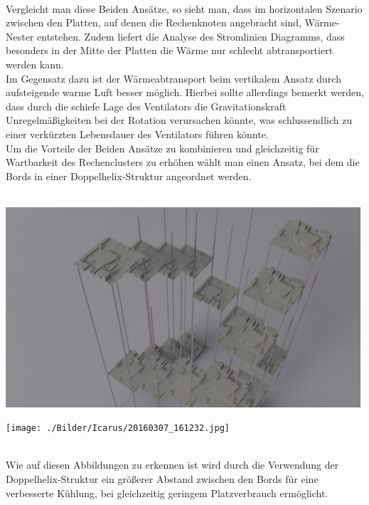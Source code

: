 ~\\
Vergleicht man diese Beiden Ansätze, so sieht man, dass im horizontalen Szenario zwischen den 
Platten, auf denen die Rechenknoten angebracht sind, Wärme-Nester entstehen. Zudem liefert die
Analyse des Stromlinien Diagramms, dass besonders in der Mitte der Platten die Wärme nur schlecht  
abtransportiert werden kann.\\
Im Gegensatz dazu ist der Wärmeabtransport beim vertikalem Ansatz durch aufsteigende warme Luft
besser möglich. Hierbei sollte allerdings bemerkt werden, dass durch die schiefe Lage des Ventilators
die Gravitationskraft Unregelmäßigkeiten bei der Rotation verursachen könnte, was schlussendlich zu einer verkürzten Lebensdauer des Ventilators führen könnte.\\
Um die Vorteile der Beiden Ansätze zu kombinieren und gleichzeitig für Wartbarkeit des 
Rechenclusters zu erhöhen wählt man einen Ansatz, bei dem die Bords in einer Doppelhelix-Struktur 
angeordnet werden.\\
~\\
\begin{minipage}{0.50\textwidth}
\centering
	\includegraphics[width=0.99\textwidth]{./Bilder/Server-Aufbau/render3.jpg}
	\label{fig:sample_figure}
\end{minipage}
\hfill
\begin{minipage}{0.50\textwidth}
\centering
	\texttt{[image: ./Bilder/Icarus/20160307\_161232.jpg]}
	\label{fig:sample_figure}
\end{minipage}
~\\
Wie auf diesen Abbildungen zu erkennen ist wird durch die Verwendung der Doppelhelix-Struktur
ein größerer Abstand zwischen den Bords für eine verbesserte Kühlung, bei gleichzeitig geringem
Platzverbrauch ermöglicht.\\ 
